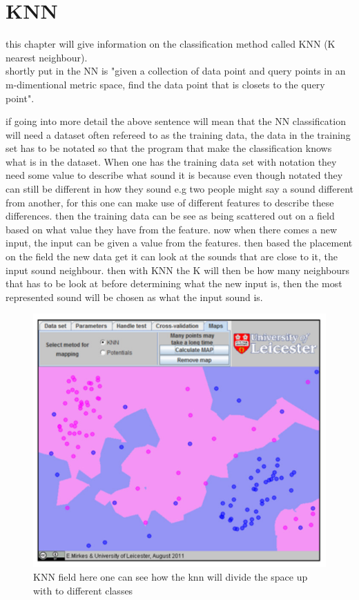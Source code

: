 \section{KNN}
this chapter will give information on the classification method called KNN (K nearest neighbour).\\
shortly put in \citep{meaningfulNN} the NN is "given a collection of data point and query points in an m-dimentional metric space, find the data point that is closets to the query point".

if going into more detail the above sentence will mean that the NN classification will need a dataset often refereed to as the training data, the data in the training set has to be notated so that the program that make the classification knows what is in the dataset. When one has the training data set with notation they need some value to describe what sound it is  because even though notated they can still be different in how they sound e.g two people might say a sound different from another, for this one can make use of different features to describe these differences. then the training data can be see as being scattered out on a field based on what value they have from the feature. now when there comes a new input, the input can be given a value from the features. then based the placement on the field the new data get it can look at the sounds that are close to it, the input sound neighbour. then with KNN the K will then be how many neighbours that has to be look at before determining what the new input is, then the most represented sound will be chosen as what the input sound is. 
\begin{figure}[h]
	\begin{center}
		\includegraphics[scale = 0.5]{fig/KNNfig.jpg}
		\caption{KNN field here one can see how the knn will divide the space up with to different classes}
		\label{KNN fig}
	\end{center}
\end{figure}
